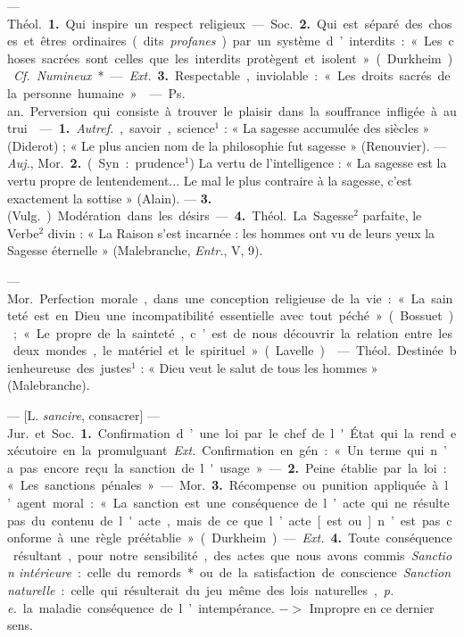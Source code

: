 
	\begin{itemize}[leftmargin=1cm, label=, itemsep=1pt]

 — \si{Théol.} {\bf 1.} Qui inspire un respect religieux. —
\si{Soc.} {\bf 2.} Qui est séparé des choses et êtres ordinaires (dits
{\it profanes}) par un système d’interdits : « Les choses sacrées sont celles
que les interdits protègent et isolent » (Durkheim). {\it Cf.}
{\it Numineux}*. — {\it Ext.} {\bf 3.} Respectable, inviolable :
« Les droits sacrés de la personne humaine. »

 — \si{Ps. an.} Perversion qui consiste à trouver le plaisir
dans la souffrance infligée à autrui.

 — {\bf 1.} {\it Autref.}, savoir, science$^1$ : « La sagesse
accumulée des siècles » (Diderot) ; « Le plus ancien nom de la philosophie
fut sagesse » (Renouvier). — {\it Auj.}, \si{Mor.} {\bf 2.} (Syn. :
prudence$^1$) La vertu de l'intelligence : « La sagesse est la vertu propre
de lentendement... Le mal le plus contraire à la sagesse, c’est exactement
la sottise » (Alain). — {\bf 3.} (\si{Vulg.}). Modération dans les désirs.

— {\bf 4.} \si{Théol.} La Sagesse$^2$ parfaite, le Verbe$^2$ divin : « La
Raison s'est incarnée : les hommes ont vu de leurs yeux la Sagesse
éternelle » (Malebranche, {\it Entr.}, V, 9).

 — \si{Mor.} Perfection morale, dans une conception religieuse
de la vie : « La sainteté est en Dieu une incompatibilité essentielle avec
tout péché » (Bossuet) ; « Le propre de la sainteté, c’est de nous découvrir
la relation entre les deux mondes, le matériel et le spirituel » (Lavelle).

 — \si{Théol.} Destinée bienheureuse des justes$^1$ : « Dieu veut
le salut de tous les hommes » (Malebranche).

 — [L. {\it sancire}, consacrer] — \si{Jur.} et \si{Soc.}
{\bf 1.} Confirmation d’une loi par le chef de l'État qui la rend exécutoire
en la promulguant. {\it Ext.} Confirmation en gén. : « Un terme qui n’a pas
encore reçu la sanction de l'usage. » — {\bf 2.} Peine établie par la loi :
« Les sanctions pénales. »

— \si{Mor.} {\bf 3.} Récompense ou punition appliquée à l’agent moral : « La
sanction est une conséquence de l’acte qui ne résulte pas du contenu
de l'acte, mais de ce que l’acte [est ou] n’est pas conforme à une règle
préétablie » (Durkheim). — {\it Ext.} {\bf 4.} Toute conséquence résultant,
pour notre sensibilité, des actes que nous avons commis. {\it Sanction
intérieure} : celle du remords* ou de la satisfaction de conscience.
{\it Sanction naturelle} : celle qui résulterait du jeu même des lois
naturelles, {\it p. e.} la maladie conséquence de l’intempérance.
$->$ Impropre en ce dernier sens.


\end{itemize}
